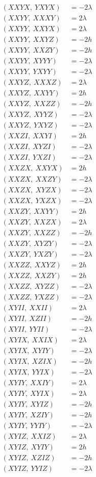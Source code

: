 \documentclass{article}
\begin{document}
\begin{align*}
  (XXYX,\ YXYX) &= - 2 \lambda \\
  (XXYY,\ XXXY) &= 2 \lambda \\
  (XXYY,\ XXYX) &= 2 \lambda \\
  (XXYY,\ XXYZ) &= - 2 h \\
  (XXYY,\ XXZY) &= - 2 h \\
  (XXYY,\ XYYY) &= - 2 \lambda \\
  (XXYY,\ YXYY) &= - 2 \lambda \\
  (XXYZ,\ XXXZ) &= 2 \lambda \\
  (XXYZ,\ XXYY) &= 2 h \\
  (XXYZ,\ XXZZ) &= - 2 h \\
  (XXYZ,\ XYYZ) &= - 2 \lambda \\
  (XXYZ,\ YXYZ) &= - 2 \lambda \\
  (XXZI,\ XXYI) &= 2 h \\
  (XXZI,\ XYZI) &= - 2 \lambda \\
  (XXZI,\ YXZI) &= - 2 \lambda \\
  (XXZX,\ XXYX) &= 2 h \\
  (XXZX,\ XXZY) &= - 2 \lambda \\
  (XXZX,\ XYZX) &= - 2 \lambda \\
  (XXZX,\ YXZX) &= - 2 \lambda \\
  (XXZY,\ XXYY) &= 2 h \\
  (XXZY,\ XXZX) &= 2 \lambda \\
  (XXZY,\ XXZZ) &= - 2 h \\
  (XXZY,\ XYZY) &= - 2 \lambda \\
  (XXZY,\ YXZY) &= - 2 \lambda \\
  (XXZZ,\ XXYZ) &= 2 h \\
  (XXZZ,\ XXZY) &= 2 h \\
  (XXZZ,\ XYZZ) &= - 2 \lambda \\
  (XXZZ,\ YXZZ) &= - 2 \lambda \\
  (XYII,\ XXII) &= 2 \lambda \\
  (XYII,\ XZII) &= - 2 h \\
  (XYII,\ YYII) &= - 2 \lambda \\
  (XYIX,\ XXIX) &= 2 \lambda \\
  (XYIX,\ XYIY) &= - 2 \lambda \\
  (XYIX,\ XZIX) &= - 2 h \\
  (XYIX,\ YYIX) &= - 2 \lambda \\
  (XYIY,\ XXIY) &= 2 \lambda \\
  (XYIY,\ XYIX) &= 2 \lambda \\
  (XYIY,\ XYIZ) &= - 2 h \\
  (XYIY,\ XZIY) &= - 2 h \\
  (XYIY,\ YYIY) &= - 2 \lambda \\
  (XYIZ,\ XXIZ) &= 2 \lambda \\
  (XYIZ,\ XYIY) &= 2 h \\
  (XYIZ,\ XZIZ) &= - 2 h \\
  (XYIZ,\ YYIZ) &= - 2 \lambda
\end{align*}
\end{document}
